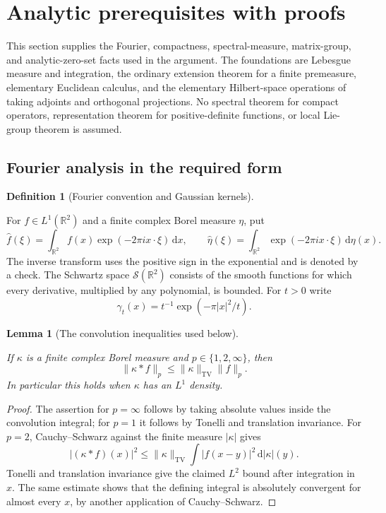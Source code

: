 \documentclass[11pt]{amsart}
\newcommand{\R}{\mathbb R}
\newcommand{\dd}{\,\mathrm d}
\newtheorem{lemma}[theorem]{Lemma}
\theoremstyle{definition}
\newtheorem{definition}[theorem]{Definition}
\theoremstyle{remark}
\numberwithin{equation}{section}
\providecommand{\lean}[1]{}
\providecommand{\leanok}{}
\begin{document}
\section{Analytic prerequisites with proofs}\label{ext:section}

This section supplies the Fourier, compactness, spectral-measure,
matrix-group, and analytic-zero-set facts used in the argument.  The
foundations are Lebesgue measure and integration, the ordinary extension
theorem for a finite premeasure, elementary Euclidean calculus, and the
elementary Hilbert-space operations of taking adjoints and orthogonal
projections.  No spectral theorem for compact operators, representation
theorem for positive-definite functions, or local Lie-group theorem is
assumed.

\subsection{Fourier analysis in the required form}

\begin{definition}[Fourier convention and Gaussian kernels]
\label{ext:fourier-convention}
\lean{Auto.FCMeasure,Auto.FCMeasure.fourier,Auto.gaussKernel}
For $f\in L^1(\R^2)$ and a finite complex Borel measure $\eta$, put
\[
 \widehat f(\xi)=\int_{\R^2}f(x)\exp(-2\pi i x\cdot\xi)\dd x,
 \qquad
 \widehat\eta(\xi)=\int_{\R^2}\exp(-2\pi i x\cdot\xi)\dd\eta(x).
\]
The inverse transform uses the positive sign in the exponential and
is denoted by a check.  The Schwartz space $\mathcal S(\R^2)$ consists
of the smooth functions for which every derivative, multiplied by any
polynomial, is bounded.  For $t>0$ write
\[
 \gamma_t(x)=t^{-1}\exp(-\pi|x|^2/t).
\]
\end{definition}

\begin{lemma}[The convolution inequalities used below]\label{ext:young}
\lean{Auto.ext_young_one,Auto.ext_young_two,Auto.ext_young_top}
\leanok
If $\kappa$ is a finite complex Borel measure and
$p\in\{1,2,\infty\}$, then
\[
 \|\kappa*f\|_p\le\|\kappa\|_{\mathrm{TV}}\|f\|_p.
\]
In particular this holds when $\kappa$ has an $L^1$ density.
\end{lemma}
\begin{proof}
The assertion for $p=\infty$ follows by taking absolute
values inside the convolution integral; for $p=1$ it follows
by Tonelli and translation invariance.  For $p=2$,
Cauchy--Schwarz against the finite measure $|\kappa|$ gives
\[
 |(\kappa*f)(x)|^2
 \le\|\kappa\|_{\mathrm{TV}}
             \int|f(x-y)|^2\dd|\kappa|(y).
\]
Tonelli and translation invariance give the claimed $L^2$
bound after integration in $x$.  The same estimate shows
that the defining integral is absolutely convergent for
almost every $x$, by another application of Cauchy--Schwarz.
\end{proof}
\end{document}
